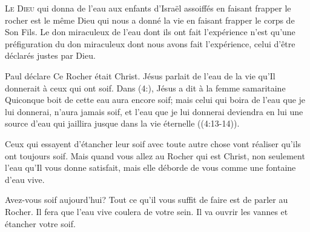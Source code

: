 


\lettrine{L}{e Dieu} qui donna de l'eau aux enfants d'Israël
 assoiffés en faisant frapper le rocher
 est le même Dieu qui nous a donné la vie
 en faisant frapper le corps de Son Fils.
 Le don miraculeux de l'eau dont ils ont fait l'expérience
 n'est qu'une préfiguration du don miraculeux
 dont nous avons fait l'expérience,
 celui d'être déclarés justes par Dieu.


Paul déclare\frcolon{}
 \Og Ce Rocher était Christ. \Fg{}
 Jésus parlait de l'eau de la vie qu'Il donnerait
 à ceux qui ont soif. Dans (4:),
 Jésus a dit à la femme samaritaine\frcolon{}
 \Og Quiconque boit de cette eau aura encore soif;
 mais celui qui boira de l'eau que je lui donnerai,
 n'aura jamais soif, et l'eau que je lui donnerai
 deviendra en lui une source d'eau qui jaillira
 jusque dans la vie éternelle \Fg{}
 ((4:13-14)).

Ceux qui essayent d'étancher leur soif
 avec toute autre chose vont réaliser qu'ils ont toujours soif.
 Mais quand vous allez au Rocher qui est Christ,
 non seulement l'eau qu'Il vous donne satisfait,
 mais elle déborde de vous comme une fontaine d'eau vive.

Avez-vous soif aujourd'hui?
 Tout ce qu'il vous suffit de faire est de parler au Rocher.
 Il fera que l'eau vive coulera de votre sein.
 Il va ouvrir les vannes et étancher votre soif.

\dvrule






